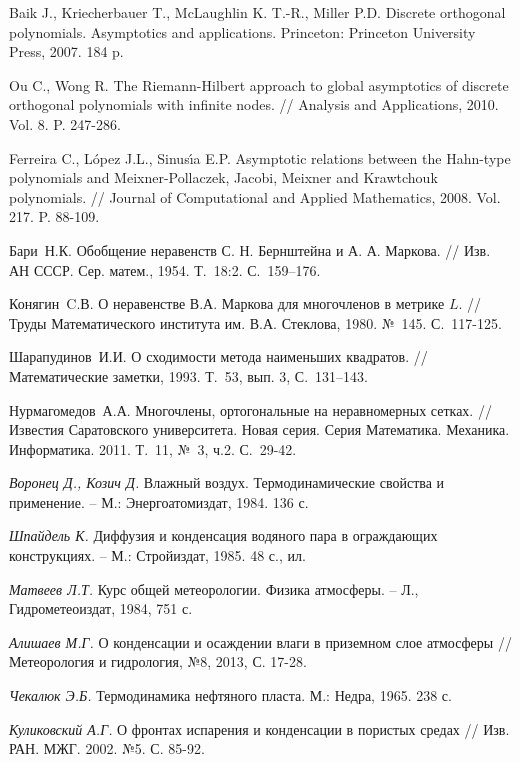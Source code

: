 \begin{thebibliography}{1}
{Baik J., Kriecherbauer T., McLaughlin K. T.-R., Miller P.D.} Discrete
orthogonal polynomials. Asymptotics and applications. Princeton:
Princeton University Press, 2007. 184 p.

{Ou C., Wong R.} The Riemann-Hilbert approach to global asymptotics
of discrete orthogonal polynomials with infinite nodes. // Analysis and
Applications, 2010. Vol. 8. P. 247-286.

{Ferreira C., L\'{o}pez J.L., Sinus\'{\i}a E.P.} Asymptotic relations between the
Hahn-type polynomials and Meixner-Pollaczek, Jacobi, Meixner and
Krawtchouk polynomials. // Journal of Computational and Applied
Mathematics, 2008. Vol. 217. P. 88-109.


{Бари~Н.К.} Обобщение неравенств С. Н. Бернштейна и А. А. Маркова. // Изв. АН СССР. Сер. матем., 1954. Т.~18:2. С.~159–176.

{Конягин~C.В.} О неравенстве В.А. Маркова для многочленов в метрике $L$. // Труды Математического института им. В.А. Стеклова, 1980. №~145. С.~117-125.

{Шарапудинов~И.И.} О сходимости метода наименьших квадратов. // Математические заметки, 1993. Т.~53, вып. 3, С.~131–143.

{Нурмагомедов~А.А.} Многочлены, ортогональные на неравномерных сетках. // Известия Саратовского университета. Новая серия. Серия Математика. Механика. Информатика. 2011. Т.~11,  №~3, ч.2. С.~29-42.



 \textbf{ }\textit{Воронец Д., Козич Д. }Влажный воздух. Термодинамические свойства и применение. -- М.:  Энергоатомиздат, 1984. 136 с.

  \textit{Шпайдель К.} Диффузия и конденсация водяного пара в ограждающих конструкциях. -- М.: Стройиздат, 1985. 48 с., ил.

  \textit{Матвеев Л.Т.} Курс общей метеорологии. Физика атмосферы. -- Л., Гидрометеоиздат, 1984, 751 с.

  \textit{Алишаев М.Г.} О конденсации и осаждении влаги в приземном слое атмосферы // Метеорология и гидрология, №8, 2013, С. 17-28.

  \textit{Чекалюк Э.Б. }Термодинамика нефтяного пласта. М.: Недра, 1965. 238 с.

  \textit{Куликовский А.Г.} О фронтах испарения и конденсации в пористых средах // Изв. РАН. МЖГ. 2002. №5. С. 85-92.


\end{thebibliography}
